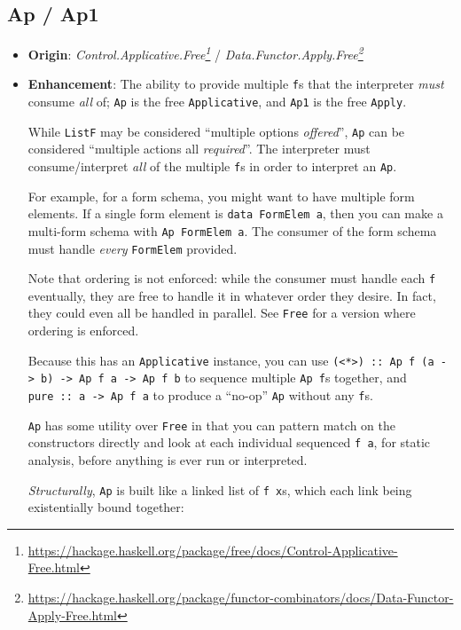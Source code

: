 \documentclass[]{article}
\renewcommand{\href}[2]{#2\footnote{\url{#1}}}
\begin{document}
\hypertarget{ap-ap1}{%
\subsection{Ap / Ap1}\label{ap-ap1}}

\begin{itemize}
\item
  \textbf{Origin}:
  \emph{\href{https://hackage.haskell.org/package/free/docs/Control-Applicative-Free.html}{Control.Applicative.Free}}
  /
  \emph{\href{https://hackage.haskell.org/package/functor-combinators/docs/Data-Functor-Apply-Free.html}{Data.Functor.Apply.Free}}
\item
  \textbf{Enhancement}: The ability to provide multiple \texttt{f}s that the
  interpreter \emph{must} consume \emph{all} of; \texttt{Ap} is the free
  \texttt{Applicative}, and \texttt{Ap1} is the free \texttt{Apply}.

  While \texttt{ListF} may be considered ``multiple options \emph{offered}'',
  \texttt{Ap} can be considered ``multiple actions all \emph{required}''. The
  interpreter must consume/interpret \emph{all} of the multiple \texttt{f}s in
  order to interpret an \texttt{Ap}.

  For example, for a form schema, you might want to have multiple form elements.
  If a single form element is \texttt{data\ FormElem\ a}, then you can make a
  multi-form schema with \texttt{Ap\ FormElem\ a}. The consumer of the form
  schema must handle \emph{every} \texttt{FormElem} provided.

  Note that ordering is not enforced: while the consumer must handle each
  \texttt{f} eventually, they are free to handle it in whatever order they
  desire. In fact, they could even all be handled in parallel. See \texttt{Free}
  for a version where ordering is enforced.

  Because this has an \texttt{Applicative} instance, you can use
  \texttt{(\textless{}*\textgreater{})\ ::\ Ap\ f\ (a\ -\textgreater{}\ b)\ -\textgreater{}\ Ap\ f\ a\ -\textgreater{}\ Ap\ f\ b}
  to sequence multiple \texttt{Ap\ f}s together, and
  \texttt{pure\ ::\ a\ -\textgreater{}\ Ap\ f\ a} to produce a ``no-op''
  \texttt{Ap} without any \texttt{f}s.

  \texttt{Ap} has some utility over \texttt{Free} in that you can pattern match
  on the constructors directly and look at each individual sequenced
  \texttt{f\ a}, for static analysis, before anything is ever run or
  interpreted.

  \emph{Structurally}, \texttt{Ap} is built like a linked list of
  \texttt{f\ x}s, which each link being existentially bound together:


\end{itemize}
\end{document}
